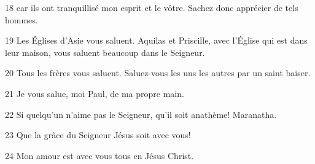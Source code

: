 \par 18 car ils ont tranquillisé mon esprit et le vôtre. Sachez donc apprécier de tels hommes.
\par 19 Les Églises d'Asie vous saluent. Aquilas et Priscille, avec l'Église qui est dans leur maison, vous saluent beaucoup dans le Seigneur.
\par 20 Tous les frères vous saluent. Saluez-vous les uns les autres par un saint baiser.
\par 21 Je vous salue, moi Paul, de ma propre main.
\par 22 Si quelqu'un n'aime pas le Seigneur, qu'il soit anathème! Maranatha.
\par 23 Que la grâce du Seigneur Jésus soit avec vous!
\par 24 Mon amour est avec vous tous en Jésus Christ.


